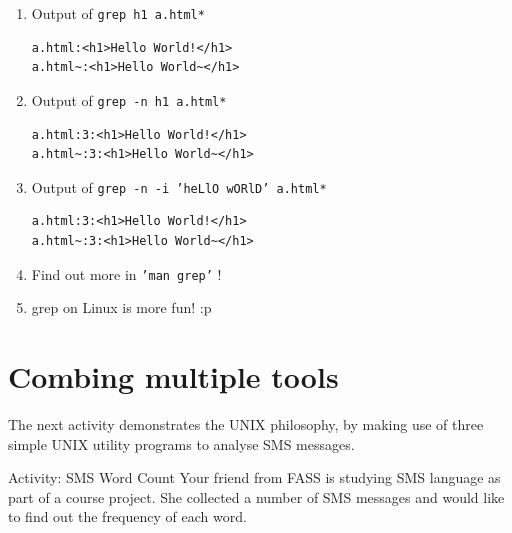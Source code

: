\begin{frame}[fragile]
\begin{enumerate}

\item Output of \texttt{grep h1 a.html*}

\begin{verbatim}
a.html:<h1>Hello World!</h1>
a.html~:<h1>Hello World~</h1>
\end{verbatim}

\pause
\item Output of \texttt{grep -n h1 a.html*}
\begin{verbatim}
a.html:3:<h1>Hello World!</h1>
a.html~:3:<h1>Hello World~</h1>
\end{verbatim}

\pause
\item Output of \texttt{grep -n -i 'heLlO wORlD' a.html*}
\begin{verbatim}
a.html:3:<h1>Hello World!</h1>
a.html~:3:<h1>Hello World~</h1>
\end{verbatim}

\pause
\item Find out more in \texttt{'man grep'} !
\pause
\item grep on Linux is more fun! :p
\end{enumerate}
\end{frame}

\section{Combing multiple tools} %
The next activity demonstrates the UNIX philosophy, by making use
of three simple UNIX utility programs to analyse SMS messages.  

\begin{frame}{Activity: SMS Word Count}
Your friend from FASS is studying SMS language as part of a course project. She
collected a number of SMS messages and would like to find out the frequency of
each word. 
\end{frame}

